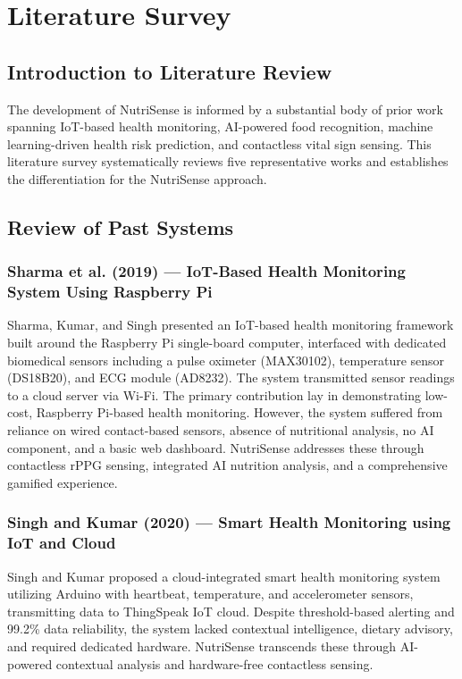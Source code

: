 \documentclass[12pt,a4paper]{report}
\begin{document}
\chapter{Literature Survey}

\section{Introduction to Literature Review}
The development of NutriSense is informed by a substantial body of prior work spanning IoT-based health monitoring, AI-powered food recognition, machine learning-driven health risk prediction, and contactless vital sign sensing. This literature survey systematically reviews five representative works and establishes the differentiation for the NutriSense approach.

\section{Review of Past Systems}

\subsection{Sharma et al. (2019) --- IoT-Based Health Monitoring System Using Raspberry Pi}
Sharma, Kumar, and Singh \cite{sharma2019} presented an IoT-based health monitoring framework built around the Raspberry Pi single-board computer, interfaced with dedicated biomedical sensors including a pulse oximeter (MAX30102), temperature sensor (DS18B20), and ECG module (AD8232). The system transmitted sensor readings to a cloud server via Wi-Fi. The primary contribution lay in demonstrating low-cost, Raspberry Pi-based health monitoring. However, the system suffered from reliance on wired contact-based sensors, absence of nutritional analysis, no AI component, and a basic web dashboard. NutriSense addresses these through contactless rPPG sensing, integrated AI nutrition analysis, and a comprehensive gamified experience.

\subsection{Singh and Kumar (2020) --- Smart Health Monitoring using IoT and Cloud}
Singh and Kumar \cite{singh2020} proposed a cloud-integrated smart health monitoring system utilizing Arduino with heartbeat, temperature, and accelerometer sensors, transmitting data to ThingSpeak IoT cloud. Despite threshold-based alerting and 99.2\% data reliability, the system lacked contextual intelligence, dietary advisory, and required dedicated hardware. NutriSense transcends these through AI-powered contextual analysis and hardware-free contactless sensing.
\end{document}
